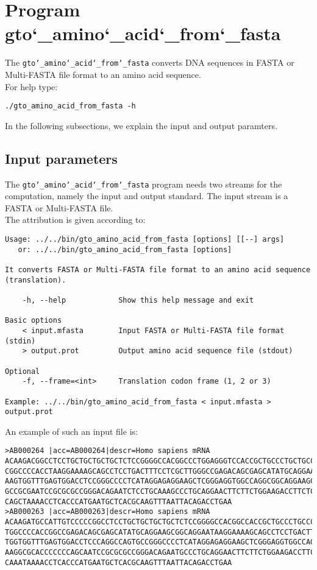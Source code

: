 \section{Program gto\char`_amino\char`_acid\char`_from\char`_fasta}
The \texttt{gto\char`_amino\char`_acid\char`_from\char`_fasta} converts DNA sequences in FASTA or Multi-FASTA file format to an amino acid sequence.\\
For help type:
\begin{lstlisting}
./gto_amino_acid_from_fasta -h
\end{lstlisting}
In the following subsections, we explain the input and output paramters.

\subsection*{Input parameters}

The \texttt{gto\char`_amino\char`_acid\char`_from\char`_fasta} program needs two streams for the computation, namely the input and output standard. The input stream is a FASTA or Multi-FASTA file.\\
The attribution is given according to:
\begin{lstlisting}
Usage: ../../bin/gto_amino_acid_from_fasta [options] [[--] args]
   or: ../../bin/gto_amino_acid_from_fasta [options]

It converts FASTA or Multi-FASTA file format to an amino acid sequence (translation).

    -h, --help            Show this help message and exit

Basic options
    < input.mfasta        Input FASTA or Multi-FASTA file format (stdin)
    > output.prot         Output amino acid sequence file (stdout)

Optional
    -f, --frame=<int>     Translation codon frame (1, 2 or 3)

Example: ../../bin/gto_amino_acid_from_fasta < input.mfasta > output.prot
\end{lstlisting}
An example of such an input file is:
\begin{lstlisting}
>AB000264 |acc=AB000264|descr=Homo sapiens mRNA 
ACAAGACGGCCTCCTGCTGCTGCTGCTCTCCGGGGCCACGGCCCTGGAGGGTCCACCGCTGCCCTGCTGCCATTGTCCC
CGGCCCCACCTAAGGAAAAGCAGCCTCCTGACTTTCCTCGCTTGGGCCGAGACAGCGAGCATATGCAGGAAGCGGCAGG
AAGTGGTTTGAGTGGACCTCCGGGCCCCTCATAGGAGAGGAAGCTCGGGAGGTGGCCAGGCGGCAGGAAGCAGGCCAGT
GCCGCGAATCCGCGCGCCGGGACAGAATCTCCTGCAAAGCCCTGCAGGAACTTCTTCTGGAAGACCTTCTCCACCCCCC
CAGCTAAAACCTCACCCATGAATGCTCACGCAAGTTTAATTACAGACCTGAA
>AB000263 |acc=AB000263|descr=Homo sapiens mRNA 
ACAAGATGCCATTGTCCCCCGGCCTCCTGCTGCTGCTGCTCTCCGGGGCCACGGCCACCGCTGCCCTGCCCCTGGAGGG
TGGCCCCACCGGCCGAGACAGCGAGCATATGCAGGAAGCGGCAGGAATAAGGAAAAGCAGCCTCCTGACTTTCCTCGCT
TGGTGGTTTGAGTGGACCTCCCAGGCCAGTGCCGGGCCCCTCATAGGAGAGGAAGCTCGGGAGGTGGCCAGGCGGCAGG
AAGGCGCACCCCCCCAGCAATCCGCGCGCCGGGACAGAATGCCCTGCAGGAACTTCTTCTGGAAGACCTTCTCCTCCTG
CAAATAAAACCTCACCCATGAATGCTCACGCAAGTTTAATTACAGACCTGAA
\end{lstlisting}

